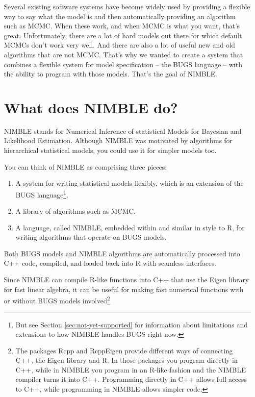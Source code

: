 \documentclass[12pt,oneside]{book}\usepackage[]{graphicx}\usepackage[]{color}
\begin{document}
Several existing software systems have become widely used by
providing a flexible way to say what the model is and then
automatically providing an algorithm such as MCMC.  When these work,
and when MCMC is what you want, that's great.  Unfortunately, there
are a lot of hard models out there for which default MCMCs don't work
very well.  And there are also a lot of useful new and old algorithms that
are not MCMC.  That's why we wanted to create a system that combines a
flexible system for model specification -- the BUGS language -- with
the ability to program with those models.  That's the goal of NIMBLE.

\section{What does NIMBLE do?}
\label{sec:what-is-nimble}

NIMBLE stands for Numerical Inference of statistical Models for Bayesian and
Likelihood Estimation.  Although NIMBLE was motivated by algorithms
for hierarchical
statistical models, you could use it for
simpler models too.

You can think of NIMBLE as comprising three pieces:

\begin{enumerate}
\item A system for writing statistical models flexibly, which is an
  extension of the BUGS language\footnote{But see Section
    \ref{sec:not-yet-supported} for information about limitations and
    extensions to how NIMBLE handles BUGS right now.}.
\item A library of algorithms such as MCMC.
\item A language, called NIMBLE, embedded within and similar in style
  to R, for writing algorithms that operate on BUGS models.
\end{enumerate}

Both BUGS models and NIMBLE algorithms are automatically processed
into C++ code, compiled, and loaded back into R with seamless
interfaces.  

Since NIMBLE can compile R-like functions into C++ that use the Eigen
library for fast linear algebra, it can be useful for making fast
numerical functions with or without BUGS models involved\footnote{The
 packages Rcpp and RcppEigen provide different ways of
  connecting C++, the Eigen library and R.  In those packages you
  program directly in C++, while in NIMBLE you program in an R-like
  fashion and the NIMBLE compiler turns it into C++.  Programming
  directly in C++ allows full access to C++, while programming in
  NIMBLE allows simpler code.}
\end{document}
